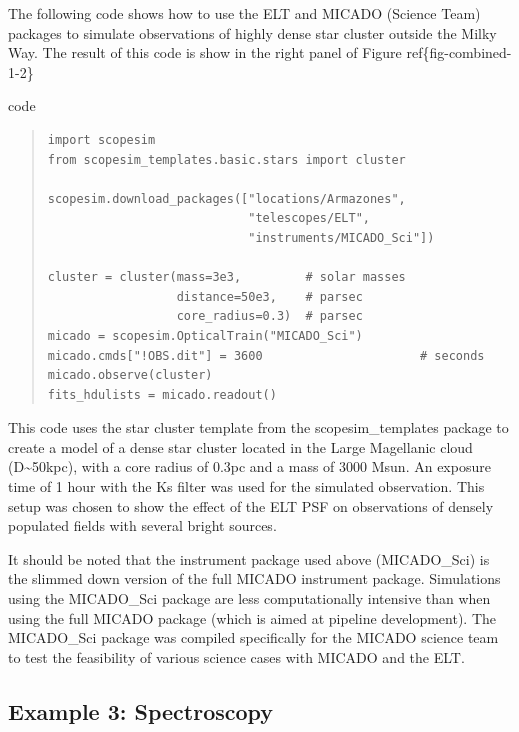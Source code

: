 The following code shows how to use the ELT and MICADO (Science Team) packages to simulate observations of highly dense star cluster outside the Milky Way.
The result of this code is show in the right panel of Figure ref\{fig-combined-1-2\}

\label{code-example-2-cluster}
\begin{DUclass}{code}
\begin{quote}
\begin{alltt}
\begin{lstlisting}[frame=single]
import scopesim
from scopesim_templates.basic.stars import cluster

scopesim.download_packages(["locations/Armazones",
                            "telescopes/ELT",
                            "instruments/MICADO_Sci"])

cluster = cluster(mass=3e3,         # solar masses
                  distance=50e3,    # parsec
                  core_radius=0.3)  # parsec
micado = scopesim.OpticalTrain("MICADO_Sci")
micado.cmds["!OBS.dit"] = 3600                      # seconds
micado.observe(cluster)
fits_hdulists = micado.readout()
\end{lstlisting}
\end{alltt}
\end{quote}
\end{DUclass}

This code uses the star cluster template from the scopesim\_templates package to create a model of a dense star cluster located in the Large Magellanic cloud (D\textasciitilde{}50kpc), with a core radius of 0.3pc and a mass of 3000 Msun.
An exposure time of 1 hour with the Ks filter was used for the simulated observation.
This setup was chosen to show the effect of the ELT PSF on observations of densely populated fields with several bright sources.

It should be noted that the instrument package used above (MICADO\_Sci) is the slimmed down version of the full MICADO instrument package.
Simulations using the MICADO\_Sci package are less computationally intensive than when using the full MICADO package (which is aimed at pipeline development).
The MICADO\_Sci package was compiled specifically for the MICADO science team to test the feasibility of various science cases with MICADO and the ELT.


\subsection{Example 3: Spectroscopy%
  \label{example-3-spectroscopy}%
}

